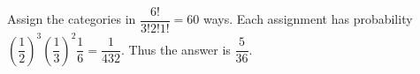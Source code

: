 Assign the categories in $\dfrac{6!}{3!2!1!}=60$ ways. Each assignment has probability $(\dfrac{1}{2})^3(\dfrac{1}{3})^2\dfrac{1}{6}=\dfrac{1}{432}$. Thus the answer is $\boxed{\dfrac{5}{36}}$.
